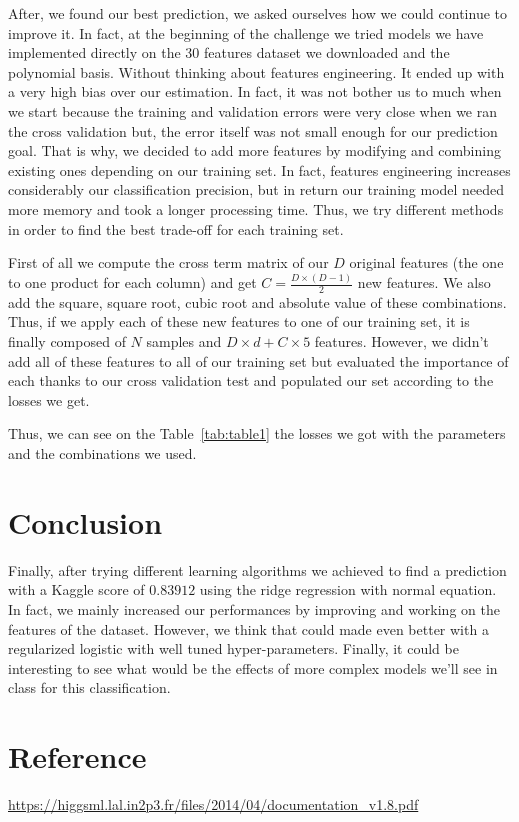 \documentclass[10pt,conference,compsocconf]{IEEEtran}
\begin{document}
After, we found our best prediction, we asked ourselves how we could continue to improve it. In fact, at the beginning of the challenge we tried models we have implemented directly on the 30 features dataset we downloaded and the polynomial basis. Without thinking about features engineering. It ended up with a very high bias over our estimation. In fact, it was not bother us to much when we start because the training and validation errors were very close when we ran the cross validation but, the error itself was not small enough for our prediction goal. That is why, we decided to add more features by modifying and combining existing ones depending on our training set. In fact, features engineering increases considerably our classification precision, but in return our training model needed more memory and took a longer processing time. Thus, we try different methods in order to find the best trade-off for each training set. 

First of all we compute the cross term matrix of our $D$ original features (the one to one product for each column) and get $C = \frac{D\times(D-1)}{2}$ new features. We also add the square, square root, cubic root and absolute value of these combinations. Thus, if we apply each of these new features to one of our training set, it is finally composed of $N$ samples and $D\times d + C\times5$ features. However, we didn't add all of these features to all of our training set but evaluated the importance of each thanks to our cross validation test and populated our set according to the losses we get.

Thus, we can see on the Table~\ref{tab:table1} the losses we got with the parameters and the combinations we used.

\section{Conclusion}

Finally, after trying different learning algorithms we achieved to find a prediction with a Kaggle score of $0.83912$ using the ridge regression with normal equation. In fact, we mainly increased our performances by improving and working on the features of the dataset. However, we think that could made even better with a regularized logistic with well tuned hyper-parameters. Finally, it could be interesting to see what would be the effects of more complex models we'll see in class for this classification.

\section{Reference} \label{sec:ref}

\url{https://higgsml.lal.in2p3.fr/files/2014/04/documentation_v1.8.pdf}
\end{document}
